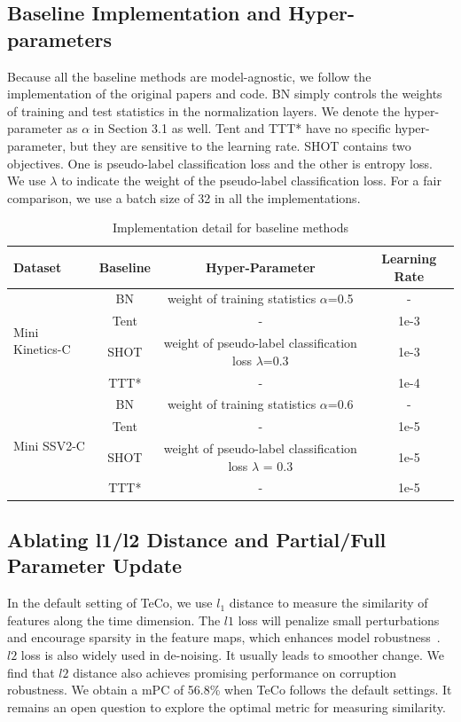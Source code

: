 \documentclass{article} %
\begin{document}
\subsection{Baseline Implementation and Hyper-parameters}
Because all the baseline methods are model-agnostic, we follow the implementation of the original papers and code. BN simply controls the weights of training and test statistics in the normalization layers. We denote the hyper-parameter as $\alpha$ in Section 3.1 as well. Tent and TTT* have no specific hyper-parameter, but they are sensitive to the learning rate. SHOT contains two objectives. One is pseudo-label classification loss and the other is entropy loss. We use $\lambda$ to indicate the weight of the pseudo-label classification loss. For a fair comparison, we use a batch size of 32 in all the implementations.
\begin{table}[h]%
\small\centering\addtolength{\tabcolsep}{-3pt}
\caption{Implementation detail for baseline methods}
\label{Tab: corruption_implement}
\begin{center}
\begin{tabular}{|l|c|c|c|}
  \hline %
  
  Dataset & Baseline & Hyper-Parameter & Learning Rate  \\
  \hline
  \multirow{4}{*}{Mini Kinetics-C}& BN & weight of training statistics $\alpha$=0.5 & -\\
  & Tent & - & 1e-3 \\
  & SHOT & weight of pseudo-label classification loss $\lambda$=0.3 & 1e-3\\
  & TTT* & -  & 1e-4 \\
  \hline
   \multirow{4}{*}{Mini SSV2-C}& BN & weight of training statistics $\alpha$=0.6&-\\
  & Tent & -& 1e-5 \\
  & SHOT & weight of pseudo-label classification loss $\lambda$ = 0.3 & 1e-5\\
  & TTT* & - & 1e-5 \\
  \hline
\end{tabular}
\end{center}
\end{table}

\subsection{Ablating l1/l2 Distance and Partial/Full Parameter Update}
In the default setting of TeCo, we use $l_1$ distance to measure the similarity of features along the time dimension. The $l1$ loss will penalize small perturbations and encourage sparsity in the feature maps, which enhances model robustness~\citep{guo2018sparse,chen2022sparsity}. $l2$ loss is also widely used in de-noising. It usually leads to smoother change. We find that $l2$ distance also achieves promising performance on corruption robustness. We obtain a mPC of 56.8\% when TeCo follows the default settings. It remains an open question to explore the optimal metric for measuring similarity.
\end{document}
